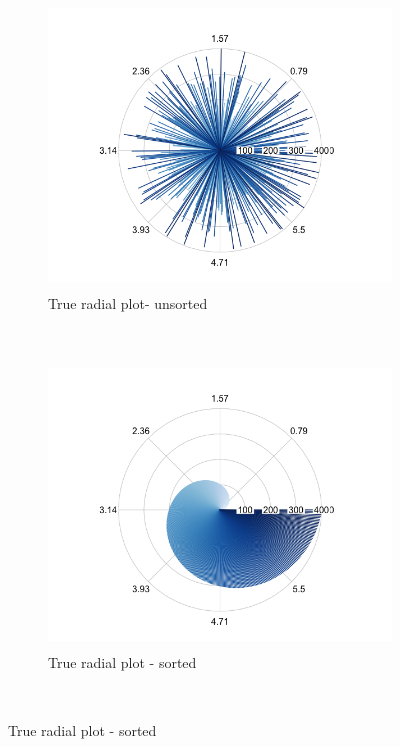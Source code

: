 \documentclass[11pt]{article}
\begin{document}
\begin{figure}[ht]
    \centering    
     \begin{subfigure}[t]{0.5\textwidth}
        \centering
        \includegraphics[height=3in]{../figures/cell_order_R_figs/original_cell_order_exp_2_unsorted.png}
        \caption{True radial plot- unsorted}
    \end{subfigure}%
    ~
    \begin{subfigure}[t]{0.5\textwidth}
        \centering
        \includegraphics[height=3in]{../figures/cell_order_R_figs/original_cell_order_exp_2_sorted.png}
        \caption{True radial plot - sorted}
    \end{subfigure}\\
    

\end{figure}
\end{document}
